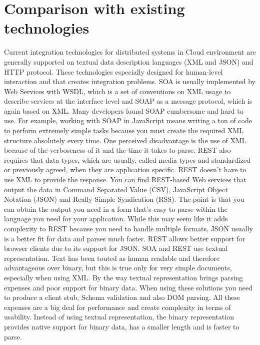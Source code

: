 \documentclass[runningheads,a4paper]{llncs}
\begin{document}
\section{Comparison with existing technologies}
Current integration technologies for distributed systems in Cloud environment are generally supported on textual data description languages (XML and JSON) and HTTP protocol. These technologies especially designed for human-level interaction and that creates integration problems.  SOA is usually implemented by Web Services with WSDL, which is a set of conventions on XML usage to describe services at the interface level and SOAP as a message protocol, which is again based on XML. Many developers found SOAP cumbersome and hard to use. For example, working with SOAP in JavaScript means writing a ton of code to perform extremely simple tasks because you must create the required XML structure absolutely every time. One perceived disadvantage is the use of XML because of the verboseness of it and the time it takes to parse. REST also requires that data types, which are usually, called media types and standardized or previously agreed, when they are application specific. REST doesn’t have to use XML to provide the response. You can find REST-based Web services that output the data in Command Separated Value (CSV), JavaScript Object Notation (JSON) and Really Simple Syndication (RSS). The point is that you can obtain the output you need in a form that’s easy to parse within the language you need for your application. While this may seem like it adds complexity to REST because you need to handle multiple formats, JSON usually is a better fit for data and parses much faster. REST allows better support for browser clients due to its support for JSON. SOA and REST use textual representation. Text has been touted as human readable and therefore advantageous over binary, but this is true only for very simple documents, especially when using XML. By the way textual representation brings parsing expenses and poor support for binary data. When using these solutions you need to produce a client stub, Schema validation and also DOM parsing. All these expenses are a big deal for performance and create complexity in terms of usability. Instead of using textual representation, the binary representation provides native support for binary data, has a smaller length and is faster to parse.
\end{document}
